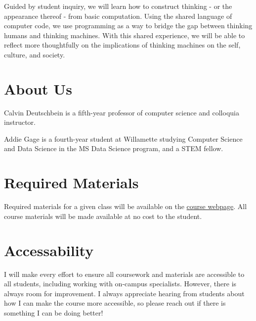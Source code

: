 \documentclass[11pt]{article}
\begin{document}
Guided by student inquiry, we will learn how to construct thinking - or the appearance thereof - from basic computation. Using the shared language of computer code, we use programming as a way to bridge the gap between thinking humans and thinking machines. With this shared experience, we will be able to reflect more thoughtfully on the implications of thinking machines on the self, culture, and society. 

\section*{About Us}
Calvin Deutschbein is a 
fifth-year professor of computer science and colloquia instructor.

Addie Gage is a fourth-year student at Willamette studying Computer Science and Data Science in the MS Data Science program, and a STEM fellow.


\section*{Required Materials}

Required materials for a given class will be available on the \href{https://cd-public.github.io/scicom}{course webpage}. All course materials will be made available at no cost to the student.




\section*{Accessability}

I will make every effort to ensure all coursework and materials are accessible to all students, including working with on-campus specialists. However, there is always room for improvement. I always appreciate hearing from students about how I can make the course more accessible, so please reach out if there is something I can be doing better!

\end{document}
